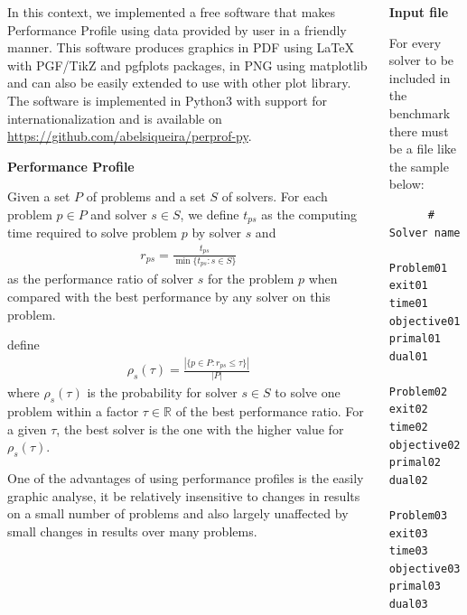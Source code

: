 \documentclass[]{beamer}
\begin{document}
\begin{frame}[t,fragile]
\begin{columns}[t]
\begin{column}{0.4\textwidth}
      In this context, we implemented a free software that makes Performance
      Profile using data provided by user in a friendly manner. This software
      produces graphics in PDF using LaTeX with PGF/TikZ\nocite{TikZ} and
      pgfplots\nocite{pgfplots} packages, in PNG using
      matplotlib\nocite{Hunter:2007} and can also be easily extended to use with
      other plot library. The software is implemented in Python3 with support
      for internationalization and is available on
      \url{https://github.com/abelsiqueira/perprof-py}.

      \textbf{Performance Profile}

      Given a set $P$ of problems and a set $S$ of solvers. For each problem $p
      \in P$ and solver $s \in S$, we define $t_{ps}$ as the computing time
      required to solve problem $p$ by solver $s$ and
      \begin{align*}
        r_{ps} = \frac{t_{ps}}{\min\{t_{ps}: s \in S\}}
      \end{align*}
      as the performance ratio of solver $s$ for the problem $p$ when compared
      with the best performance by any solver on this problem.

      \citeauthor{Dolan2001} define
      \begin{align*}
        \rho_s(\tau) = \frac{| \{p \in P: r_{ps} \leq \tau\} |}{| P |}
      \end{align*}
      where $\rho_s(\tau)$ is the probability for solver $s \in S$ to solve one
      problem within a factor $\tau \in \mathbb{R}$ of the best performance
      ratio. For a given $\tau$, the best solver is the one with the higher
      value for $\rho_s(\tau)$.

      One of the advantages of using performance profiles is the easily graphic
      analyse, it be relatively insensitive to changes in results on a small
      number of problems and also largely unaffected by small changes in
      results over many problems.
    \end{column}
    \begin{column}{0.4\textwidth}
      \setlength{\parskip}{\baselineskip}
      \textbf{Input file}

      For every solver to be included in the benchmark there must be a file like
      the sample below:

      \begin{lstlisting}
      # Solver name
      Problem01 exit01 time01 objective01 primal01 dual01
      Problem02 exit02 time02 objective02 primal02 dual02
      Problem03 exit03 time03 objective03 primal03 dual03
      \end{lstlisting}


\end{column}
\end{columns}
\end{frame}
\end{document}
